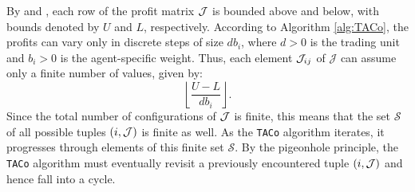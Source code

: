 \begin{customproof}
By  and , each row of the profit matrix $\mathcal{J}$ is bounded above and below, with bounds denoted by $U$ and $L$, respectively. According to Algorithm \ref{alg:TACo}, the profits can vary only in discrete steps of size $d b_i$, where $d > 0$ is the trading unit and $b_i > 0$ is the agent-specific weight. Thus, each element $\mathcal{J}_{ij}$ of $\mathcal{J}$ can assume only a finite number of values, given by:
\begin{equation}\label{eq:elementNum}
    \textstyle{\left\lfloor \frac{U - L}{d b_i} \right\rfloor}.
\end{equation}
Since the total number of configurations of $\mathcal{J}$ is finite, this means that the set $\mathcal{S}$ of all possible tuples $(i, \mathcal{J})$ is finite as well. As the \texttt{TACo} algorithm iterates, it progresses through elements of this finite set $\mathcal{S}$. By the pigeonhole principle, the \texttt{TACo} algorithm must eventually revisit a previously encountered tuple $(i, \mathcal{J})$ and hence fall into a cycle.
\end{customproof}


